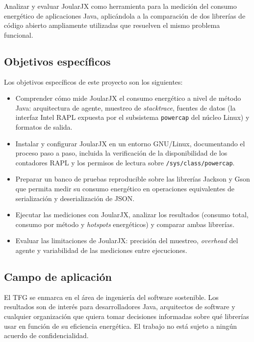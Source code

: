 \documentclass[11pt,a4paper,oneside]{article}
\begin{document}
Analizar y evaluar JoularJX como herramienta para la medición del
consumo energético de aplicaciones Java, aplicándola a la comparación de
dos librerías de código abierto ampliamente utilizadas que resuelven el
mismo problema funcional.

\subsection*{Objetivos específicos}

Los objetivos específicos de este proyecto son los siguientes:

\begin{itemize}
\item Comprender cómo mide JoularJX el consumo energético a nivel de
  método Java: arquitectura de agente, muestreo de \textit{stacktrace},
  fuentes de datos (la interfaz Intel RAPL expuesta por el subsistema
  \texttt{powercap} del núcleo Linux) y formatos de salida.

\item Instalar y configurar JoularJX en un entorno GNU/Linux,
  documentando el proceso paso a paso, incluida la verificación de la
  disponibilidad de los contadores RAPL y los permisos de lectura sobre
  \texttt{/sys/class/powercap}.

\item Preparar un banco de pruebas reproducible sobre las librerías
  Jackson y Gson que permita medir su consumo energético en operaciones
  equivalentes de serialización y deserialización de JSON.

\item Ejecutar las mediciones con JoularJX, analizar los resultados
  (consumo total, consumo por método y \textit{hotspots} energéticos) y
  comparar ambas librerías.

\item Evaluar las limitaciones de JoularJX: precisión del muestreo,
  \textit{overhead} del agente y variabilidad de las mediciones entre
  ejecuciones.
\end{itemize}

\subsection*{Campo de aplicación}

El TFG se enmarca en el área de ingeniería del software sostenible. Los
resultados son de interés para desarrolladores Java, arquitectos de
software y cualquier organización que quiera tomar decisiones informadas
sobre qué librerías usar en función de su eficiencia energética. El
trabajo no está sujeto a ningún acuerdo de confidencialidad.
\end{document}
